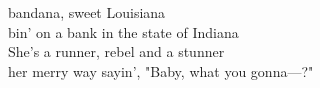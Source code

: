  bandana, sweet Louisiana \\
bin' on a bank in the state of Indiana \\
\songwordfb{} She's a runner, rebel and a stunner \\
 her merry way sayin', "Baby, what you gonna—?" \\
